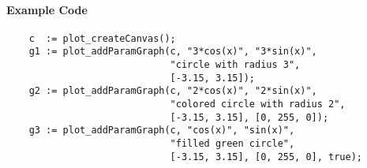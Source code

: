 \paragraph{Example Code}
\begin{verbatim}
    c  := plot_createCanvas();
    g1 := plot_addParamGraph(c, "3*cos(x)", "3*sin(x)", 
                             "circle with radius 3", 
                             [-3.15, 3.15]);
    g2 := plot_addParamGraph(c, "2*cos(x)", "2*sin(x)", 
                             "colored circle with radius 2", 
                             [-3.15, 3.15], [0, 255, 0]);
    g3 := plot_addParamGraph(c, "cos(x)", "sin(x)", 
                             "filled green circle", 
                             [-3.15, 3.15], [0, 255, 0], true);
\end{verbatim}


